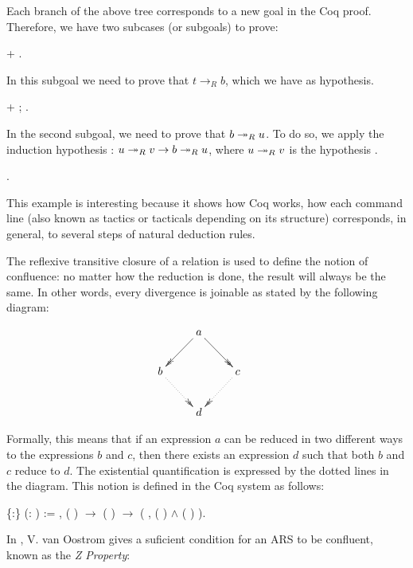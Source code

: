       Each branch of the above tree corresponds to a new goal in the
      Coq proof. Therefore, we have two subcases (or subgoals) to
      prove: \begin{coqdoccode}
\coqdocemptyline
\coqdocindent{2.00em}
+ . \end{coqdoccode}
In this subgoal we need to prove that $t \to_R
    b$, which we have as hypothesis. \begin{coqdoccode}
\coqdocemptyline
\coqdocindent{2.00em}
+  ; . \end{coqdoccode}
In the second subgoal, we
    need to prove that $b \twoheadrightarrow_R u$. To do so, we apply the induction
    hypothesis : $u \twoheadrightarrow_R v \to b \twoheadrightarrow_R u$, where
    $u\twoheadrightarrow_R v$ is the hypothesis . \begin{coqdoccode}
\coqdocnoindent
{}.\coqdoceol
\coqdocemptyline
\end{coqdoccode}
This example is interesting because it shows how Coq works, how
each command line (also known as tactics or tacticals depending on its
structure) corresponds, in general, to several steps of natural
deduction rules. \begin{coqdoccode}
\coqdocemptyline
\coqdocemptyline
\end{coqdoccode}
The reflexive transitive closure of a relation is used to define
    the notion of confluence: no matter how the reduction is done, the
    result will always be the same. In other words, every divergence
    is joinable as stated by the following diagram:


    $\centerline{\xymatrix{ & a \ar@{->>}[dl] \ar@{->>}[dr] & \\ b
    \ar@{.>>}[dr] & & c \ar@{.>>}[dl] \\ & d & }}$


    Formally, this means that if an expression $a$ can be reduced in
    two different ways to the expressions $b$ and $c$, then there
    exists an expression $d$ such that both $b$ and $c$ reduce to
    $d$. The existential quantification is expressed by the dotted
    lines in the diagram. This notion is defined in the Coq system as
    follows: \begin{coqdoccode}
\coqdocemptyline
\coqdocnoindent
{}  \{:\} (:  ) := \coqdockw{\ensuremath{\forall}}   , ( )   \ensuremath{\rightarrow} ( )   \ensuremath{\rightarrow} (\coqdoctac{\ensuremath{\exists}} , ( )   \ensuremath{\land} ( )  ).\coqdoceol
\coqdocemptyline
\end{coqdoccode}
In \cite{ZPropertyDraft}, V. van Oostrom gives a suficient
    condition for an ARS to be confluent, known as the \textit{Z Property}:


